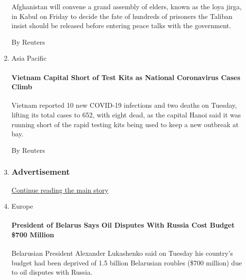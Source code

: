 \begin{enumerate}
  Afghanistan will convene a grand assembly of elders, known as the loya
  jirga, in Kabul on Friday to decide the fate of hundreds of prisoners
  the Taliban insist should be released before entering peace talks with
  the government.

  By Reuters
\item
  Asia Pacific

  \href{/reuters/2020/08/04/world/asia/04reuters-health-coronavirus-vietnam.html?searchResultPosition=4}{}

  \hypertarget{vietnam-capital-short-of-test-kits-as-national-coronavirus-cases-climb}{%
  \paragraph{Vietnam Capital Short of Test Kits as National Coronavirus
  Cases
  Climb}\label{vietnam-capital-short-of-test-kits-as-national-coronavirus-cases-climb}}

  Vietnam reported 10 new COVID-19 infections and two deaths on Tuesday,
  lifting its total cases to 652, with eight dead, as the capital Hanoi
  said it was running short of the rapid testing kits being used to keep
  a new outbreak at bay.

  By Reuters
\item
  \hypertarget{advertisement}{%
  \subsubsection{Advertisement}\label{advertisement}}

  \protect\hyperlink{after-mid192}{Continue reading the main story}
\item
  Europe

  \href{/reuters/2020/08/04/world/europe/04reuters-belarus-election-president-russia.html?searchResultPosition=5}{}

  \hypertarget{president-of-belarus-says-oil-disputes-with-russia-cost-budget-700-million}{%
  \paragraph{President of Belarus Says Oil Disputes With Russia Cost
  Budget \$700
  Million}\label{president-of-belarus-says-oil-disputes-with-russia-cost-budget-700-million}}

  Belarusian President Alexander Lukashenko said on Tuesday his
  country's budget had been deprived of 1.5 billion Belarusian roubles
  (\$700 million) due to oil disputes with Russia.


\end{enumerate}
